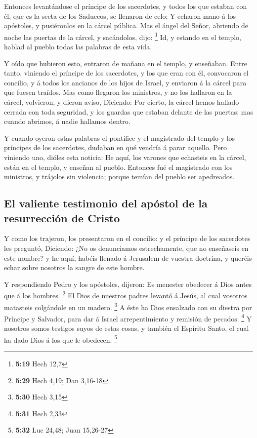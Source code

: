  Entonces levantándose el príncipe de los sacerdotes, y
todos los que estaban con él, que es la secta de los Saduceos, se
llenaron de celo;  Y echaron mano á los apóstoles, y
pusiéronlos en la cárcel pública.  Mas el ángel del Señor,
abriendo de noche las puertas de la cárcel, y sacándolos, dijo:
\footnote{\textbf{5:19} Hech 12,7}  Id, y estando en el
templo, hablad al pueblo todas las palabras de esta vida.

 Y oído que hubieron esto, entraron de mañana en el templo,
y enseñaban. Entre tanto, viniendo el príncipe de los sacerdotes, y los
que eran con él, convocaron el concilio, y á todos los ancianos de los
hijos de Israel, y enviaron á la cárcel para que fuesen traídos.
 Mas como llegaron los ministros, y no los hallaron en la
cárcel, volvieron, y dieron aviso,  Diciendo: Por cierto,
la cárcel hemos hallado cerrada con toda seguridad, y los guardas que
estaban delante de las puertas; mas cuando abrimos, á nadie hallamos
dentro.

 Y cuando oyeron estas palabras el pontífice y el
magistrado del templo y los príncipes de los sacerdotes, dudaban en qué
vendría á parar aquello.  Pero viniendo uno, dióles esta
noticia: He aquí, los varones que echasteis en la cárcel, están en el
templo, y enseñan al pueblo.  Entonces fué el magistrado
con los ministros, y trájolos sin violencia; porque temían del pueblo
ser apedreados.

\hypertarget{el-valiente-testimonio-del-apuxf3stol-de-la-resurrecciuxf3n-de-cristo}{%
\subsection{El valiente testimonio del apóstol de la resurrección de
Cristo}\label{el-valiente-testimonio-del-apuxf3stol-de-la-resurrecciuxf3n-de-cristo}}

 Y como los trajeron, los presentaron en el concilio: y el
príncipe de los sacerdotes les preguntó,  Diciendo: ¿No os
denunciamos estrechamente, que no enseñaseis en este nombre? y he aquí,
habéis llenado á Jerusalem de vuestra doctrina, y queréis echar sobre
nosotros la sangre de este hombre.

 Y respondiendo Pedro y los apóstoles, dijeron: Es menester
obedecer á Dios antes que á los hombres. \footnote{\textbf{5:29} Hech
  4,19; Dan 3,16-18}  El Dios de nuestros padres levantó á
Jesús, al cual vosotros matasteis colgándole en un madero. \footnote{\textbf{5:30}
  Hech 3,15}  A éste ha Dios ensalzado con su diestra por
Príncipe y Salvador, para dar á Israel arrepentimiento y remisión de
pecados. \footnote{\textbf{5:31} Hech 2,33}  Y nosotros
somos testigos suyos de estas cosas, y también el Espíritu Santo, el
cual ha dado Dios á los que le obedecen. \footnote{\textbf{5:32} Luc
  24,48; Juan 15,26-27}

